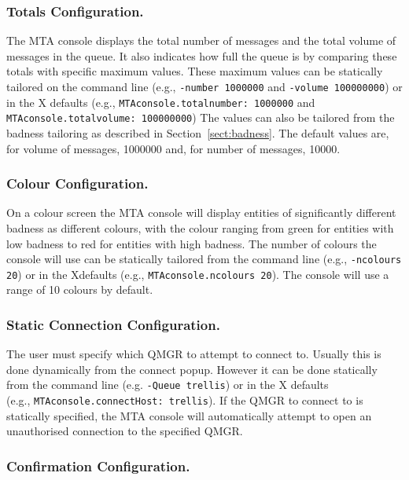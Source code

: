 \subsubsection	{Totals Configuration.}

The MTA console displays the total number of messages and the total volume
of messages in the queue.
It also indicates how full the queue is by comparing these totals with
specific maximum values.
These maximum values can be statically tailored on the command line
(e.g., \verb+-number 1000000+ and \verb+-volume 100000000+) or in the X
defaults (e.g., \verb+MTAconsole.totalnumber: 1000000+ and
\verb+MTAconsole.totalvolume: 100000000+)
The values can also be tailored from the badness tailoring as
described in Section~\ref{sect:badness}.
The default values are, for volume of messages, 1000000 and, for number
of messages, 10000.

\subsubsection	{Colour Configuration.}

On a colour screen the MTA console will display entities of
significantly different badness as different colours, with the colour
ranging from green for 
entities with low badness to red for entities with high badness.
The number of colours the console will use can be statically tailored
from the command line (e.g., \verb+-ncolours 20+) or in the Xdefaults
(e.g., \verb+MTAconsole.ncolours 20+).
The console will use a range of 10 colours by default.

\subsubsection	{Static Connection Configuration.}

The user must specify which QMGR to attempt to connect to.
Usually this is done dynamically from the connect popup.
However it can be done statically from the command line (e.g.
\verb+-Queue trellis+) or in the X defaults \\ 
(e.g., \verb+MTAconsole.connectHost: trellis+).
If the QMGR to connect to is statically specified, the MTA console
will automatically attempt to open an unauthorised connection to the
specified QMGR.

\subsubsection	{Confirmation Configuration.}

